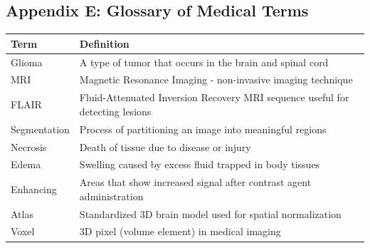 \documentclass[12pt,a4paper]{article}
\begin{document}
\subsection{Appendix E: Glossary of Medical Terms}

\begin{table}[H]
\centering
\begin{tabularx}{\textwidth}{|l|X|}
\hline
\textbf{Term} & \textbf{Definition} \\
\hline
Glioma & A type of tumor that occurs in the brain and spinal cord \\
\hline
MRI & Magnetic Resonance Imaging - non-invasive imaging technique \\
\hline
FLAIR & Fluid-Attenuated Inversion Recovery MRI sequence useful for detecting lesions \\
\hline
Segmentation & Process of partitioning an image into meaningful regions \\
\hline
Necrosis & Death of tissue due to disease or injury \\
\hline
Edema & Swelling caused by excess fluid trapped in body tissues \\
\hline
Enhancing & Areas that show increased signal after contrast agent administration \\
\hline
Atlas & Standardized 3D brain model used for spatial normalization \\
\hline
Voxel & 3D pixel (volume element) in medical imaging \\
\hline
\end{tabularx}
\end{table}
\end{document}
